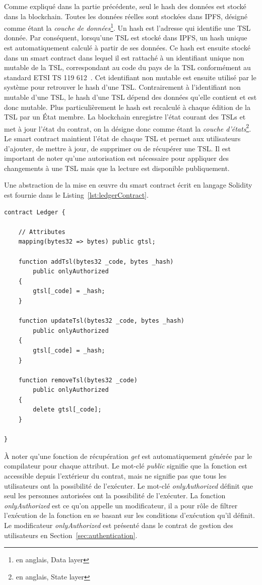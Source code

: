 \documentclass{tnreport}
\begin{document}
Comme expliqué dans la partie précédente, seul le hash des données est stocké dans la blockchain.
Toutes les données réelles sont stockées dans IPFS, désigné comme étant la {\em couche de données}\footnote{en anglais, Data layer}. 
Un hash est l'adresse qui identifie une TSL donnée. 
Par conséquent, lorsqu'une TSL est stocké dans IPFS, un hash unique est automatiquement calculé à partir de ses données. 
Ce hash est ensuite stocké dans un smart contract dans lequel il est rattaché à un identifiant unique non mutable de la TSL, correspondant au code du pays de la TSL conformément au standard ETSI TS 119 612~\cite{ETSITS119612}.
Cet identifiant non mutable est ensuite utilisé par le système pour retrouver le hash d'une TSL.
Contrairement à l'identifiant non mutable d'une TSL, le hash d'une TSL dépend des données qu'elle contient et est donc mutable. 
Plus particulièrement le hash est recalculé à chaque édition de la TSL par un État membre.
La blockchain enregistre l'état courant des TSLs et met à jour l'état du contrat, on la désigne donc comme étant la {\em couche d'états}\footnote{en anglais, State layer}. 
Le smart contract maintient l'état de chaque TSL et permet aux utilisateurs d'ajouter, de mettre à jour, de supprimer ou de récupérer une TSL.
Il est important de noter qu'une autorisation est nécessaire pour appliquer des changements à une TSL mais que la lecture est disponible publiquement.

Une abstraction de la mise en œuvre du smart contract écrit en langage Solidity est fournie dans le Listing~\ref{lst:ledgerContract}.

\clearpage
\begin{lstlisting}[language=solidity, basicstyle=\small, caption={Ledger Contract}, label={lst:ledgerContract}]
contract Ledger {
	
	// Attributes
	mapping(bytes32 => bytes) public gtsl;
	
	function addTsl(bytes32 _code, bytes _hash)
		public onlyAuthorized
	{
		gtsl[_code] = _hash;
	}
	
	function updateTsl(bytes32 _code, bytes _hash)
		public onlyAuthorized
	{
		gtsl[_code] = _hash;
	}
	
	function removeTsl(bytes32 _code)
		public onlyAuthorized
	{
		delete gtsl[_code];
	}
	
}
\end{lstlisting}

À noter qu'une fonction de récupération {\em get} est automatiquement générée par le compilateur pour chaque attribut. Le mot-clé {\em public} signifie que la fonction est accessible depuis l'extérieur du contrat, mais ne signifie pas que tous les utilisateurs ont la possibilité de l'exécuter. Le mot-clé {\em onlyAuthorized} définit que seul les personnes autorisées ont la possibilité de l'exécuter. La fonction {\em onlyAuthorized} est ce qu'on appelle un modificateur, il a pour rôle de filtrer l'exécution de la fonction en se basant sur les conditions d'exécution qu'il définit. Le modificateur {\em onlyAuthorized} est présenté dans le contrat de gestion des utilisateurs en Section~\ref{sec:authentication}.
\end{document}
